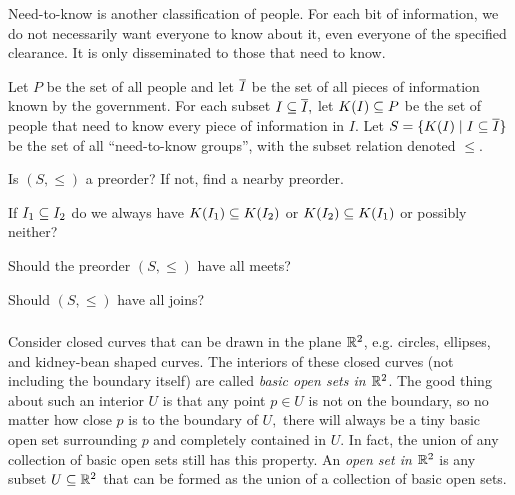 \documentclass[CT4S-EN-RU]{subfiles}
\begin{document}
\begin{blockENG}
Need-to-know is another classification of people. For each bit of information, we do not necessarily want everyone to know about it, even everyone of the specified clearance. It is only disseminated to those that need to know. 
\end{blockENG}

\begin{blockRUS}
\end{blockRUS}

\begin{exerciseENG}
Let $P$ be the set of all people and let $\ol{I}$ be the set of all pieces of information known by the government. For each subset $I\ss\ol{I},$ let $K(I)\ss P$ be the set of people that need to know every piece of information in $I.$ Let $S=\{K(I)\|I\ss\ol{I}\}$ be the set of all “need-to-know groups”, with the subset relation denoted $\leq.$ 

\sexc Is $(S,\leq)$ a preorder? If not, find a nearby preorder. 
\item If $I_1\ss I_2$ do we always have $K(I_1)\ss K(I_2)$ or $K(I_2)\ss K(I_1)$ or possibly neither? 
\item Should the preorder $(S,\leq)$ have all meets? 
\item Should $(S,\leq)$ have all joins?
\endsexc
\end{exerciseENG}

\begin{exerciseRUS}
\end{exerciseRUS}


\subsubsection{}

\begin{blockENG}
Consider closed curves that can be drawn in the plane $\RR^2$, e.g. circles, ellipses, and kidney-bean shaped curves. The interiors of these closed curves (not including the boundary itself) are called {\em basic open sets in $\RR^2$}. The good thing about such an interior $U$ is that any point $p\in U$ is not on the boundary, so no matter how close $p$ is to the boundary of $U,$ there will always be a tiny basic open set surrounding $p$ and completely contained in $U.$ In fact, the union of any collection of basic open sets still has this property. An {\em open set in $\RR^2$} is any subset $U\ss \RR^2$ that can be formed as the union of a collection of basic open sets.
\end{blockENG}
\end{document}
